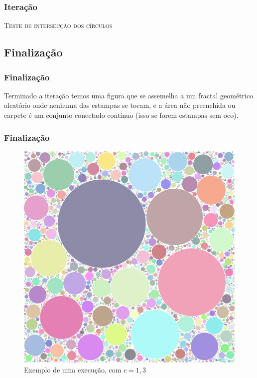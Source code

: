 \documentclass[aspectratio=169]{beamer}
\begin{document}
\begin{frame}
\frametitle{Iteração}

\begin{algorithm}[H]
   \SetAlgoLined
   \label{alg1}
   \caption{\textsc{Teste de intersecção dos círculos}}
 \end{algorithm}

\end{frame}

\subsection{Finalização}
\begin{frame}
\frametitle{Finalização}
Terminado a iteração temos uma figura que se assemelha a um fractal geométrico aleatório onde nenhuma das estampas se tocam, e a área não preenchida ou carpete é um conjunto conectado contínuo (isso se forem estampas sem oco).
\end{frame}

\begin{frame}
\frametitle{Finalização}

\begin{figure}[h]
\caption{Exemplo de uma execução, com $c=1,3$}
\centering
\includegraphics[width=\textwidth,height=0.7\textheight,keepaspectratio]{exemplo1}
\end{figure}

\end{frame}
\end{document}
